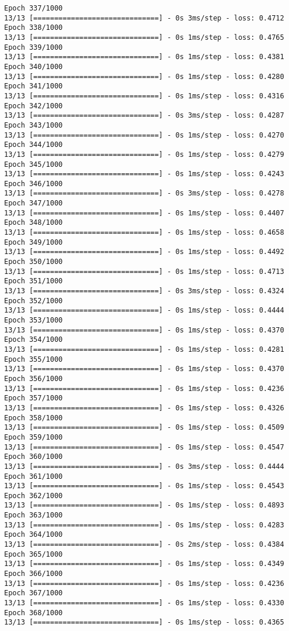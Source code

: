 \documentclass[11pt]{article}
\begin{document}
\begin{Verbatim}[commandchars=\\\{\}]
Epoch 337/1000
13/13 [==============================] - 0s 3ms/step - loss: 0.4712
Epoch 338/1000
13/13 [==============================] - 0s 1ms/step - loss: 0.4765
Epoch 339/1000
13/13 [==============================] - 0s 1ms/step - loss: 0.4381
Epoch 340/1000
13/13 [==============================] - 0s 1ms/step - loss: 0.4280
Epoch 341/1000
13/13 [==============================] - 0s 1ms/step - loss: 0.4316
Epoch 342/1000
13/13 [==============================] - 0s 3ms/step - loss: 0.4287
Epoch 343/1000
13/13 [==============================] - 0s 1ms/step - loss: 0.4270
Epoch 344/1000
13/13 [==============================] - 0s 1ms/step - loss: 0.4279
Epoch 345/1000
13/13 [==============================] - 0s 1ms/step - loss: 0.4243
Epoch 346/1000
13/13 [==============================] - 0s 3ms/step - loss: 0.4278
Epoch 347/1000
13/13 [==============================] - 0s 1ms/step - loss: 0.4407
Epoch 348/1000
13/13 [==============================] - 0s 1ms/step - loss: 0.4658
Epoch 349/1000
13/13 [==============================] - 0s 1ms/step - loss: 0.4492
Epoch 350/1000
13/13 [==============================] - 0s 1ms/step - loss: 0.4713
Epoch 351/1000
13/13 [==============================] - 0s 3ms/step - loss: 0.4324
Epoch 352/1000
13/13 [==============================] - 0s 1ms/step - loss: 0.4444
Epoch 353/1000
13/13 [==============================] - 0s 1ms/step - loss: 0.4370
Epoch 354/1000
13/13 [==============================] - 0s 1ms/step - loss: 0.4281
Epoch 355/1000
13/13 [==============================] - 0s 1ms/step - loss: 0.4370
Epoch 356/1000
13/13 [==============================] - 0s 1ms/step - loss: 0.4236
Epoch 357/1000
13/13 [==============================] - 0s 1ms/step - loss: 0.4326
Epoch 358/1000
13/13 [==============================] - 0s 1ms/step - loss: 0.4509
Epoch 359/1000
13/13 [==============================] - 0s 1ms/step - loss: 0.4547
Epoch 360/1000
13/13 [==============================] - 0s 3ms/step - loss: 0.4444
Epoch 361/1000
13/13 [==============================] - 0s 1ms/step - loss: 0.4543
Epoch 362/1000
13/13 [==============================] - 0s 1ms/step - loss: 0.4893
Epoch 363/1000
13/13 [==============================] - 0s 1ms/step - loss: 0.4283
Epoch 364/1000
13/13 [==============================] - 0s 2ms/step - loss: 0.4384
Epoch 365/1000
13/13 [==============================] - 0s 1ms/step - loss: 0.4349
Epoch 366/1000
13/13 [==============================] - 0s 1ms/step - loss: 0.4236
Epoch 367/1000
13/13 [==============================] - 0s 1ms/step - loss: 0.4330
Epoch 368/1000
13/13 [==============================] - 0s 1ms/step - loss: 0.4365

\end{Verbatim}
\end{document}
